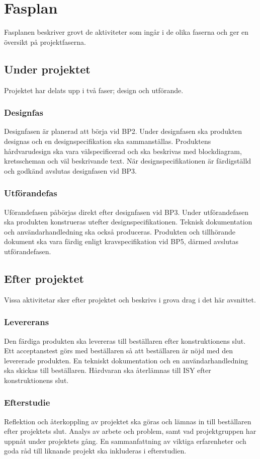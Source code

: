 \documentclass[projektplan/plan.tex]{subfiles}
\begin{document}
\section{Fasplan}
Fasplanen beskriver grovt de aktiviteter som ingår i de olika faserna och ger
en översikt på projektfaserna.

\subsection{Under projektet}
Projektet har delats upp i två faser; design och utförande.

\subsubsection*{Designfas}
Designfasen är planerad att börja vid BP2. Under designfasen ska produkten
designas och en designspecifikation ska sammanställas. Produktens
hårdvarudesign ska vara välspecificerad och ska beskrivas med blockdiagram,
kretsscheman och väl beskrivande text. När designspecifikationen är
färdigställd och godkänd avslutas designfasen vid BP3.

\subsubsection*{Utförandefas}
Uförandefasen påbörjas direkt efter designfasen vid BP3. Under utförandefasen
ska produkten konstrueras utefter designspecifikationen. Teknisk dokumentation
och användarhandledning ska också produceras. Produkten och tillhörande
dokument ska vara färdig enligt kravspecifikation vid BP5, därmed avslutas
utförandefasen.

\subsection{Efter projektet}
Vissa aktivitetar sker efter projektet och beskrivs i grova drag i det här
avsnittet.

\subsubsection*{Levererans}
Den färdiga produkten ska levereras till beställaren efter konstruktionens
slut. Ett acceptanstest görs med beställaren så att beställaren är nöjd med den
levererade produkten. En tekniskt dokumentation och en användarhandledning ska
skickas till beställaren. Hårdvaran ska återlämnas till ISY efter
konstruktionens slut.

\subsubsection*{Efterstudie}
Reflektion och återkoppling av projektet ska göras och lämnas in till
beställaren efter projektets slut. Analys av arbete och problem, samt vad
projektgruppen har uppnåt under projektets gång. En sammanfattning av viktiga
erfarenheter och goda råd till liknande projekt ska inkluderas i efterstudien.
\end{document}
